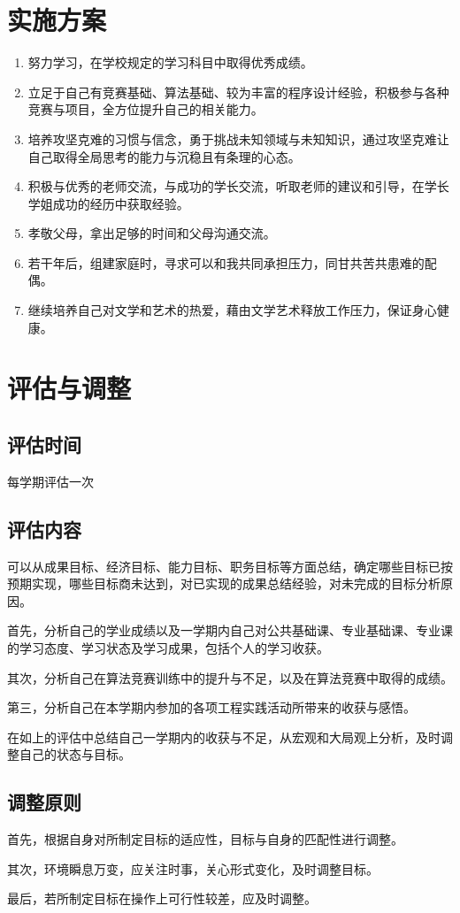 \documentclass{article}
\begin{document}
\section{实施方案}
\begin{enumerate}[1、]
	\item {努力学习，在学校规定的学习科目中取得优秀成绩。}
	\item {立足于自己有竞赛基础、算法基础、较为丰富的程序设计经验，积极参与各种竞赛与项目，全方位提升自己的相关能力。}
	\item {培养攻坚克难的习惯与信念，勇于挑战未知领域与未知知识，通过攻坚克难让自己取得全局思考的能力与沉稳且有条理的心态。}
	\item {积极与优秀的老师交流，与成功的学长交流，听取老师的建议和引导，在学长学姐成功的经历中获取经验。}
	\item {孝敬父母，拿出足够的时间和父母沟通交流。}
	\item {若干年后，组建家庭时，寻求可以和我共同承担压力，同甘共苦共患难的配偶。}
	\item {继续培养自己对文学和艺术的热爱，藉由文学艺术释放工作压力，保证身心健康。}
\end{enumerate}


\section{评估与调整}

\subsection{评估时间}
每学期评估一次

\subsection{评估内容}
可以从成果目标、经济目标、能力目标、职务目标等方面总结，确定哪些目标已按预期实现，哪些目标商未达到，对已实现的成果总结经验，对未完成的目标分析原因。\par
首先，分析自己的学业成绩以及一学期内自己对公共基础课、专业基础课、专业课的学习态度、学习状态及学习成果，包括个人的学习收获。\par
其次，分析自己在算法竞赛训练中的提升与不足，以及在算法竞赛中取得的成绩。\par
第三，分析自己在本学期内参加的各项工程实践活动所带来的收获与感悟。\par
在如上的评估中总结自己一学期内的收获与不足，从宏观和大局观上分析，及时调整自己的状态与目标。

\subsection{调整原则}
首先，根据自身对所制定目标的适应性，目标与自身的匹配性进行调整。\par
其次，环境瞬息万变，应关注时事，关心形式变化，及时调整目标。\par
最后，若所制定目标在操作上可行性较差，应及时调整。
\end{document}
